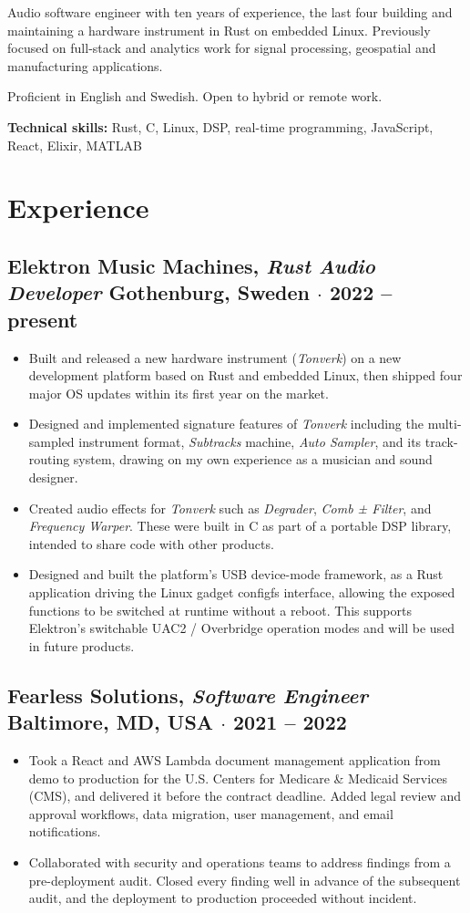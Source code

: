 \documentclass[10pt]{article}
\newcommand{\entry}[4]{%
  \subsection*{#1, \textnormal{\normalsize\textit{#3}}%
    \hfill \textnormal{\small #2 $\cdot$ #4}}%
}
\begin{document}

Audio software engineer with ten years of experience, the last four building
and maintaining a hardware instrument in Rust on embedded Linux. Previously
focused on full-stack and analytics work for signal processing, geospatial and
manufacturing applications.

\vspace{2ex}

Proficient in English and Swedish. Open to hybrid or remote work.

\vspace{2ex}

\textbf{Technical skills:} Rust, C, Linux, DSP, real-time programming, JavaScript,
React, Elixir, MATLAB

\dotfill

\section*{Experience}
\entry{Elektron Music Machines}{Gothenburg, Sweden}{Rust Audio Developer}{2022 -- present}
\begin{itemize}
  \item Built and released a new hardware instrument (\textit{Tonverk}) on a
    new development platform based on Rust and embedded Linux, then shipped
    four major OS updates within its first year on the market.
  \item Designed and implemented signature features of \textit{Tonverk}
    including the multi-sampled instrument format, \mbox{\textit{Subtracks}}
    machine, \textit{Auto Sampler}, and its track-routing system, drawing on my
    own experience as a musician and sound designer.
  \item Created audio effects for \textit{Tonverk} such as \textit{Degrader},
    \textit{Comb ± Filter}, and \textit{Frequency Warper}. These were built in
    C as part of a portable DSP library, intended to share code with other
    products.
  \item Designed and built the platform's USB device-mode framework, as a Rust
    application driving the Linux gadget configfs interface, allowing the
    exposed functions to be switched at runtime without a reboot. This supports
    Elektron's switchable UAC2 / Overbridge operation modes and will be used in
    future products.
\end{itemize}

\entry{Fearless Solutions}{Baltimore, MD, USA}{Software Engineer}{2021 -- 2022}
\begin{itemize}
  \item Took a React and AWS Lambda document management application from demo
    to production for the U.S. Centers for Medicare \& Medicaid Services (CMS),
    and delivered it before the contract deadline. Added legal review and
    approval workflows, data migration, user management, and email
    notifications.
  \item Collaborated with security and operations teams to address findings
    from a pre-deployment audit. Closed every finding well in advance of the
    subsequent audit, and the deployment to production proceeded without
    incident.
\end{itemize}
\end{document}
